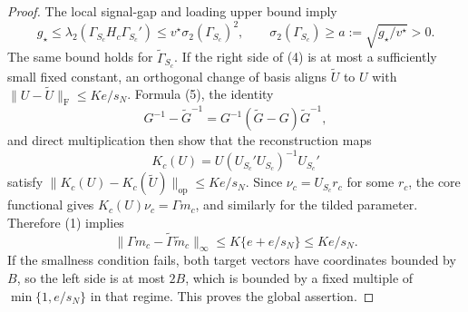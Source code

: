\documentclass{article}
\begin{document}
\begin{proof}
The local signal-gap and loading upper bound imply
\[
g_\star\leq\lambda_2(\Gamma_{S_c}H_c\Gamma_{S_c}')
\leq v^\star\sigma_2(\Gamma_{S_c})^2,
\qquad
\sigma_2(\Gamma_{S_c})\geq a:=\sqrt{g_\star/v^\star}>0. \tag{5}
\]
The same bound holds for \(\widetilde\Gamma_{S_c}\). If the right side of (4) is at most a sufficiently small fixed constant, an orthogonal change of basis aligns \(\widetilde U\) to \(U\) with \(\|U-\widetilde U\|_{\mathrm F}\leq K e/s_N\). Formula (5), the identity
\[
G^{-1}-\widetilde G^{-1}=G^{-1}(\widetilde G-G)\widetilde G^{-1},
\]
and direct multiplication then show that the reconstruction maps
\[
K_c(U)=U(U_{S_c}'U_{S_c})^{-1}U_{S_c}'
\]
satisfy \(\|K_c(U)-K_c(\widetilde U)\|_{\mathrm{op}}\leq Ke/s_N\). Since \(\nu_c=U_{S_c}r_c\) for some \(r_c\), the core functional gives \(K_c(U)\nu_c=\Gamma m_c\), and similarly for the tilded parameter. Therefore (1) implies
\[
\|\Gamma m_c-\widetilde\Gamma\widetilde m_c\|_\infty
\leq K\{e+e/s_N\}\leq Ke/s_N.
\]
If the smallness condition fails, both target vectors have coordinates bounded by \(B\), so the left side is at most \(2B\), which is bounded by a fixed multiple of \(\min\{1,e/s_N\}\) in that regime. This proves the global assertion.
\end{proof}
\end{document}
